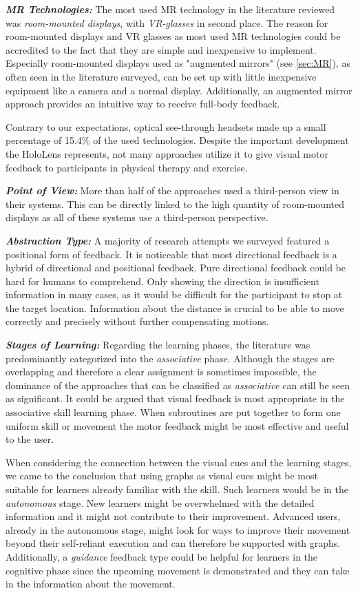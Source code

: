 \textbf{\emph{MR Technologies:}} The most used MR technology in the literature reviewed was \emph{room-mounted displays}, with \emph{VR-glasses} in second place. The reason for room-mounted displays and VR glasses as most used MR technologies could be accredited to the fact that they are simple and inexpensive to implement. Especially room-mounted displays used as "augmented mirrors" (see \autoref{sec:MR}), as often seen in the literature surveyed, can be set up with little inexpensive equipment like a camera and a normal display. Additionally, an augmented mirror approach provides an intuitive way to receive full-body feedback.

Contrary to our expectations, optical see-through headsets made up a small percentage of 15.4\% of the used technologies. Despite the important development the HoloLens represents, not many approaches utilize it to give visual motor feedback to participants in physical therapy and exercise.

\textbf{\emph{Point of View:}} More than half of the approaches used a third-person view in their systems. This can be directly linked to the high quantity of room-mounted displays as all of these systems use a third-person perspective.

\textbf{\emph{Abstraction Type:}} A majority of research attempts we surveyed featured a positional form of feedback. It is noticeable that most directional feedback is a hybrid of directional and positional feedback. Pure directional feedback could be hard for humans to comprehend. Only showing the direction is insufficient information in many cases, as it would be difficult for the participant to stop at the target location. Information about the distance is crucial to be able to move correctly and precisely without further compensating motions.

\textbf{\emph{Stages of Learning:}} Regarding the learning phases, the literature was predominantly categorized into the \emph{associative} phase. Although the stages are overlapping and therefore a clear assignment is sometimes impossible, the dominance of the approaches that can be classified as \emph{associative} can still be seen as significant. It could be argued that visual feedback is most appropriate in the associative skill learning phase. When subroutines are put together to form one uniform skill or movement the motor feedback might be most effective and useful to the user.

When considering the connection between the visual cues and the learning stages, we came to the conclusion that using graphs as visual cues might be most suitable for learners already familiar with the skill. Such learners would be in the \emph{autonomous} stage. New learners might be overwhelmed with the detailed information and it might not contribute to their improvement. Advanced users, already in the autonomous stage, might look for ways to improve their movement beyond their self-reliant execution and can therefore be supported with graphs. Additionally, a \emph{guidance} feedback type could be helpful for learners in the cognitive phase since the upcoming movement is demonstrated and they can take in the information about the movement.


